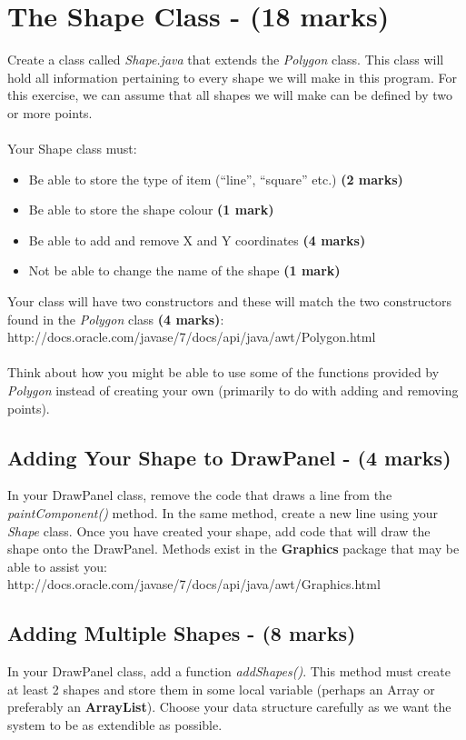 \documentclass[a4paper,12pt]{article}
\begin{document}
\section{The Shape Class - (18 marks)}
Create a class called \textit{Shape.java} that extends the \textit{Polygon} class. This class will hold all information pertaining to every shape we will make in this program. For this exercise, we can assume that all shapes we will make can be defined by two or more points.\\
\\
Your Shape class must:
\begin{itemize}
\item Be able to store the type of item (``line'', ``square'' etc.) {\bf (2 marks)}
\item Be able to store the shape colour {\bf (1 mark)}
\item Be able to add and remove X and Y coordinates {\bf (4 marks)}
\item Not be able to change the name of the shape {\bf (1 mark)}
\end{itemize}
Your class will have two constructors and these will match the two constructors found in the \textit{Polygon} class {\bf (4 marks)}:\\

http://docs.oracle.com/javase/7/docs/api/java/awt/Polygon.html\\
\\
Think about how you might be able to use some of the functions provided by \textit{Polygon} instead of creating your own (primarily to do with adding and removing points).

\subsection{Adding Your Shape to DrawPanel - (4 marks)}
In your DrawPanel class, remove the code that draws a line from the \textit{paintComponent()} method. In the same method, create a new line using your \textit{Shape} class. Once you have created your shape, add code that will draw the shape onto the DrawPanel. Methods exist in the {\bf Graphics} package that may be able to assist you:\\

http://docs.oracle.com/javase/7/docs/api/java/awt/Graphics.html

\subsection{Adding Multiple Shapes - (8 marks)}
In your DrawPanel class, add a function \textit{addShapes()}. This method must create at least 2 shapes and store them in some local variable (perhaps an Array or preferably an {\bf ArrayList}). Choose your data structure carefully as we want the system to be as extendible as possible.\\
\end{document}
